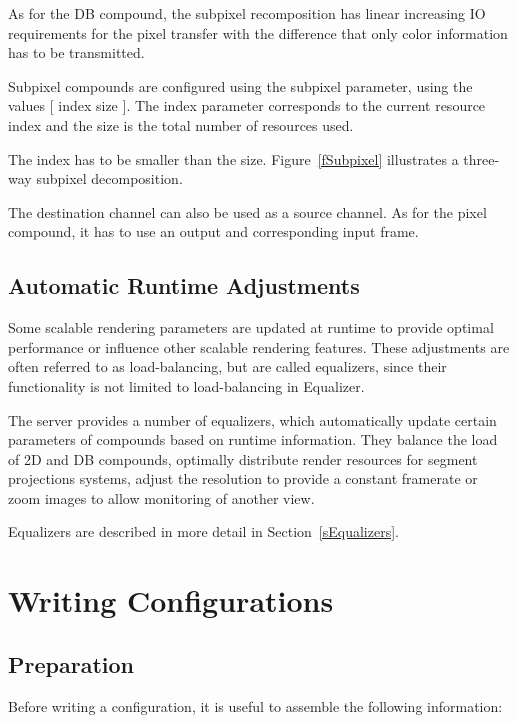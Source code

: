 \documentclass[10pt,a4]{scrartcl}
\newcommand{\fig}[1]{Figure~\ref{#1}}
\newcommand{\sref}[1]{Section~\ref{#1}}
\begin{document}
As for the DB compound, the subpixel recomposition has linear increasing 
IO requirements for the pixel transfer with the difference that only 
color information has to be transmitted.

Subpixel compounds are configured using the \textsf{subpixel} parameter, using
the values \textsf{[ index size ]}. The \textsf{index} parameter corresponds to
the current resource index and the \textsf{size} is the total number of
resources used.

The \textsf{index} has to be smaller than the \textsf{size}. 
\fig{fSubpixel} illustrates a three-way subpixel decomposition.

The destination channel can also be used as a source channel. 
As for the pixel compound, it has to use an output and corresponding 
input frame.


\subsection{\label{sLoadBalancing}Automatic Runtime Adjustments}

Some scalable rendering parameters are updated at runtime to provide
optimal performance or influence other scalable rendering
features. These adjustments are often referred to as load-balancing, but
are called \textsf{equalizers}, since their functionality is not limited
to load-balancing in Equalizer.

The server provides a number of equalizers, which automatically update
certain parameters of compounds based on runtime information. They
balance the load of 2D and DB compounds, optimally distribute render
resources for segment projections systems, adjust the resolution
to provide a constant framerate or zoom images to allow monitoring of
another view.

Equalizers are described in more detail in \sref{sEqualizers}.


\section{\label{sConfig}Writing Configurations}

\subsection{Preparation}

Before writing a configuration, it is useful to assemble the following
information:
\end{document}
